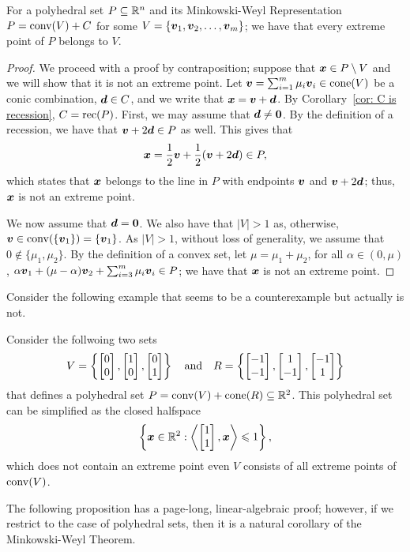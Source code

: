 \begin{theorem}
For a polyhedral set $P\subseteq \mathbb R^n$ and its Minkowski-Weyl Representation $P = \operatorname{conv}(V) + C$ for some $V = \{{\boldsymbol v}_1, {\boldsymbol v}_2, \dots, {\boldsymbol v}_m\}$; we have that every extreme point of $P$ belongs to $V$. 
\end{theorem}
\begin{proof}
We proceed with a proof by contraposition; suppose that ${\boldsymbol x}\in P\setminus V$ and we will show that it is not an extreme point. Let ${\boldsymbol v} = \sum_{i=1}^m \mu_i {\boldsymbol v}_i \in \operatorname{cone}(V)$ be a conic combination, ${\boldsymbol d}\in C$, and we write that ${\boldsymbol x} =  {\boldsymbol v} + {\boldsymbol d}$. By Corollary~\ref{cor: C is recession}, $C = \operatorname{rec}(P)$. First, we may assume that ${\boldsymbol d} \neq \boldsymbol0$. By the definition of a recession, we have that ${\boldsymbol v} + 2{\boldsymbol d}\in P$ as well. This gives that 
\[{\boldsymbol x} = \frac12 {\boldsymbol v} + \frac12({\boldsymbol v} + 2{\boldsymbol d}) \in P, \]
which states that ${\boldsymbol x}$ belongs to the line in $P$ with endpoints ${\boldsymbol v}$ and ${\boldsymbol v} + 2{\boldsymbol d}$; thus, ${\boldsymbol x}$ is not an extreme point. 

We now assume that ${\boldsymbol d} = \boldsymbol0$. We also have that $|V| > 1$ as, otherwise, ${\boldsymbol v}\in\operatorname{conv}(\{{\boldsymbol v}_1\}) = \{{\boldsymbol v}_1\}$. As $|V| >1$, without loss of generality, we assume that $0\not\in \{\mu_1, \mu_2\}$. By the definition of a convex set, let $\mu = \mu_1 + \mu_2$, for all $\alpha\in(0, \mu)$, $ \alpha{\boldsymbol v}_1 + (\mu - \alpha){\boldsymbol v}_2 + \sum_{i = 3}^m \mu_i {\boldsymbol v}_i \in P$; we have that ${\boldsymbol x}$ is not an extreme point.  
\end{proof}

Consider the following example that seems to be a counterexample but actually is not.
\begin{example}
Consider the follwoing two sets \[ V = \left\{\begin{bmatrix} 0\\0 \end{bmatrix}, \begin{bmatrix} 1\\0 \end{bmatrix}, \begin{bmatrix} 0\\1 \end{bmatrix}\right\} \quad\text{and}\quad R = \left\{ \begin{bmatrix} -1\\-1 \end{bmatrix}, \begin{bmatrix} 1\\ -1 \end{bmatrix}, \begin{bmatrix} -1\\ 1 \end{bmatrix} \right\} \] that defines a polyhedral set $P = \operatorname{conv}(V) + \operatorname{cone}(R)\subseteq \mathbb R^2$. This polyhedral set can be simplified as the closed halfspace \[\left\{ {\boldsymbol x}\in\mathbb R^2: \left\langle\begin{bmatrix} 1\\ 1 \end{bmatrix}, {\boldsymbol x}\right\rangle \leqslant 1\right\}, \]
which does not contain an extreme point even $V$ consists of all extreme points of $\operatorname{conv}(V)$. 
\end{example}


The following proposition has a page-long, linear-algebraic proof; however, if we restrict to the case of polyhedral sets, then it is a natural corollary of the Minkowski-Weyl Theorem. 

